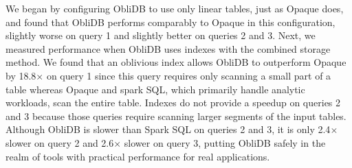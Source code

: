 \documentclass[letterpaper,twocolumn,10pt]{article}
\def\name/{ObliDB}
\begin{document}
We began by configuring \name/ to use only linear tables, just as Opaque does, and found that \name/ performs comparably to Opaque in this configuration, slightly worse on query 1 and slightly better on queries 2 and 3. Next, we measured performance when \name/ uses indexes with the combined storage method. We found that an oblivious index allows \name/ to outperform Opaque by 18.8$\times$ on query 1 since this query requires only scanning a small part of a table whereas Opaque and spark SQL, which primarily handle analytic workloads, scan the entire table. Indexes do not provide a speedup on queries 2 and 3 because those queries require scanning larger segments of the input tables. Although \name/ is slower than Spark SQL on queries 2 and 3, it is only 2.4$\times$ slower on query 2 and 2.6$\times$ slower on query 3, putting \name/ safely in the realm of tools with practical performance for real applications. 
\end{document}
